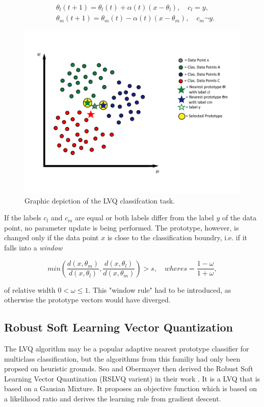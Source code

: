 \documentclass[12pt,oneside,a4paper,parskip]{scrbook}
\begin{document}
\begin{equation}
  \begin{split}
    &\theta_l(t+1) = \theta_l(t) + \alpha(t)(x-\theta_l), \quad c_l = y,\\
    &\theta_m(t+1) = \theta_m(t) - \alpha(t)(x-\theta_m), \quad c_m \neg y.
  \end{split}
  \label{equ:LVQ3}
\end{equation}

\begin{figure}[H]
  \includegraphics[width=0.75\linewidth]{LVQ}
  \caption{Graphic depiction of the LVQ classifcation task.}
  \label{fig:LVQ}
\end{figure}

If the labels $c_l$ and $c_m$ are equal or both labels differ from the label $y$ of the data point, no parameter update is being performed.
The prototype, however, is changed only if the data point $x$ is close to the classification boundry, i.e.
if it falls into a \textit{window}

\begin{equation}
    min(\frac{d(x,\theta_m)}{d(x,\theta_l)},\frac{d(x,\theta_l)}{d(x,\theta_m)}) > s, \quad where s = \frac{1-\omega}{1+\omega},
\end{equation}

of relative width $0<\omega\leq1$. This "window rule" had to be introduced, as otherwise the prototype vectors would have diverged. \cite{RSLVQOrig}

\subsection{Robust Soft Learning Vector Quantization}

The LVQ algorithm may be a popular adaptive nearest prototype classifier for multiclass classification, 
but the algorithms from this familiy had only been propsed on heuristic grounds. Seo and Obermayer then derived the 
Robust Soft Learning Vector Quantization (RSLVQ varient) in their work \cite{RSLVQOrig}. It is a LVQ that is based on 
a Gausian Mixture. It proposes an objective function which is based on a likelihood ratio and derives the
learning rule from gradient descent.
\end{document}
